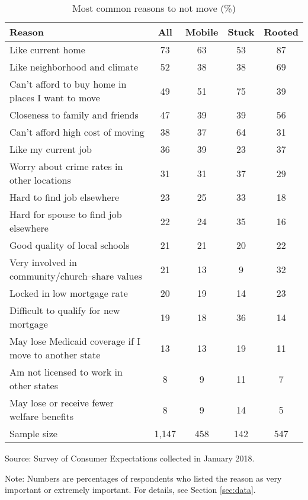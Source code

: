 \begin{table}[ht]
\caption{Most common reasons to not move (\%)}
\label{tab:descT3}
\centering
\begin{threeparttable}
\begin{tabular}{lcccc}
\toprule 
Reason & All & Mobile & Stuck & Rooted \\
\midrule 
Like current home                                     & 73 & 63 & 53 & 87 \\ 
Like neighborhood and climate                         & 52 & 38 & 38 & 69 \\ 
Can't afford to buy home in places I want to move     & 49 & 51 & 75 & 39 \\ 
Closeness to family and friends                       & 47 & 39 & 39 & 56 \\ 
Can't afford high cost of moving                      & 38 & 37 & 64 & 31 \\ 
Like my current job                                   & 36 & 39 & 23 & 37 \\ 
Worry about crime rates in other locations            & 31 & 31 & 37 & 29 \\ 
Hard to find job elsewhere                            & 23 & 25 & 33 & 18 \\ 
Hard for spouse to find job elsewhere                 & 22 & 24 & 35 & 16 \\ 
Good quality of local schools                         & 21 & 21 & 20 & 22 \\ 
Very involved in community/church--share values       & 21 & 13 &  9 & 32 \\ 
Locked in low mortgage rate                           & 20 & 19 & 14 & 23 \\ 
Difficult to qualify for new mortgage                 & 19 & 18 & 36 & 14 \\ 
May lose Medicaid coverage if I move to another state & 13 & 13 & 19 & 11 \\ 
Am not licensed to work in other states               &  8 &  9 & 11 &  7 \\ 
May lose or receive fewer welfare benefits            &  8 &  9 & 14 &  5 \\ 
\midrule 
Sample size                      & 1,147 &   458 &   142 &   547 \\ 
\bottomrule 
\end{tabular} 
\footnotesize{Source: Survey of Consumer Expectations collected in January 2018.
 
Note: Numbers are percentages of respondents who listed the reason as very important or extremely important. For details, see Section \ref{sec:data}.}
\end{threeparttable} 
\end{table} 
